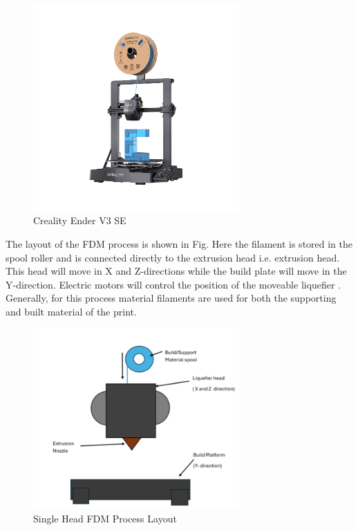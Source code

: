 \begin{figure}[htbp]
    \centering
    \includegraphics[width=0.7\textwidth]{figures/CAD-3DPrint/NassPrinter.png}
    \caption{Creality Ender V3 SE}
    \label{fig:NassPrint}
\end{figure}

The layout of the FDM process is shown in Fig. Here the filament is stored in the spool roller and is connected directly to the extrusion head i.e. extrusion head. 
This head will move in X and Z-directions while the build plate will move in the Y-direction. 
Electric motors will control the position of the moveable liquefier \cite{RefWorks:RefID:85-mohd2020review}. 
Generally, for this process material filaments are used for both the supporting and built material of the print.

\begin{figure}[htbp]
    \centering
    \includegraphics[width=0.7\textwidth]{figures/CAD-3DPrint/FDMProcess.png}
    \caption{Single Head FDM Process Layout}
    \label{fig:FDMProcess}
    
\end{figure}

